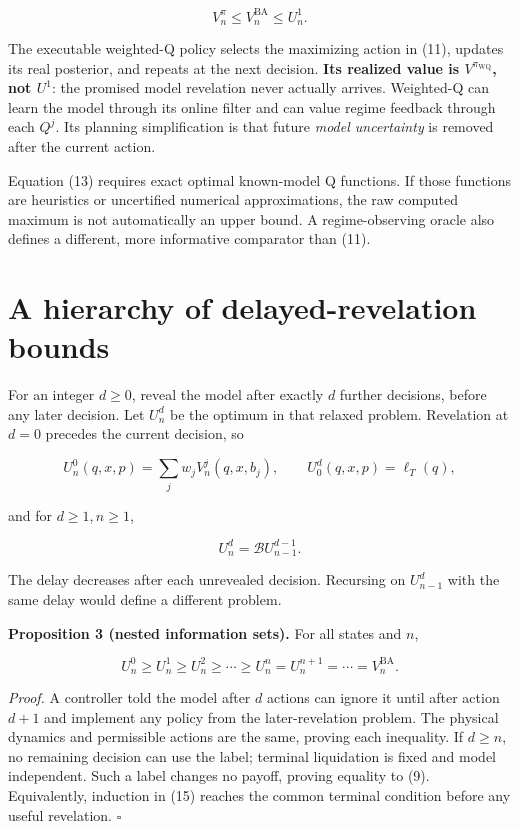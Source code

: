 \documentclass[10pt,a4paper]{article}
\begin{document}
\begin{equation}
\boxed{\quad V^\pi_n\le V^{\mathrm{BA}}_n\le U^1_n.\quad}
\tag{13}
\end{equation}

The executable weighted-Q policy selects the maximizing action in (11), updates
its real posterior, and repeats at the next decision. \textbf{Its realized value is
$V^{\pi_{\mathrm{WQ}}}$, not $U^1$}: the promised model revelation never
actually arrives. Weighted-Q can learn the model through its online filter and
can value regime feedback through each $Q^j$. Its planning simplification
is that future \emph{model uncertainty} is removed after the current action.

Equation (13) requires exact optimal known-model Q functions. If those functions
are heuristics or uncertified numerical approximations, the raw computed
maximum is not automatically an upper bound. A regime-observing oracle also
defines a different, more informative comparator than (11).

\section{A hierarchy of delayed-revelation bounds}

For an integer $d\ge0$, reveal the model after exactly $d$ further
decisions, before any later decision. Let $U^d_n$ be the optimum in that
relaxed problem. Revelation at $d=0$ precedes the current decision, so

\begin{equation}
U^0_n(q,x,p)=\sum_jw_jV^j_n(q,x,b_j),\qquad
U^d_0(q,x,p)=\ell_T(q),
\tag{14}
\end{equation}

and for $d\ge1,n\ge1$,

\begin{equation}
U^d_n=\mathcal B U^{d-1}_{n-1}.
\tag{15}
\end{equation}

The delay decreases after each unrevealed decision. Recursing on $U^d_{n-1}$
with the same delay would define a different problem.

\textbf{Proposition 3 (nested information sets).} For all states and $n$,

\begin{equation}
U^0_n\ge U^1_n\ge U^2_n\ge\cdots\ge U^n_n
=U^{n+1}_n=\cdots=V^{\mathrm{BA}}_n.
\tag{16}
\end{equation}

\emph{Proof.} A controller told the model after $d$ actions can ignore it until
after action $d+1$ and implement any policy from the later-revelation
problem. The physical dynamics and permissible actions are the same, proving
each inequality. If $d\ge n$, no remaining decision can use the label;
terminal liquidation is fixed and model independent. Such a label changes no
payoff, proving equality to (9). Equivalently, induction in (15) reaches the
common terminal condition before any useful revelation. $\square$
\end{document}
